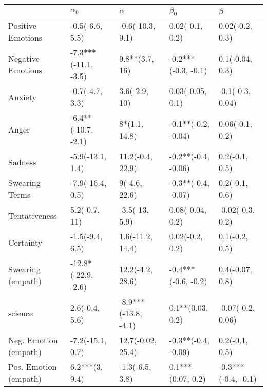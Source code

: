 \begin{tabular}{lllll}
\toprule
{} &            $\alpha_0$ &              $\alpha$ &            $\beta_0$ &              $\beta$ \\
\midrule
Positive Emotions     &       -0.5(-6.6, 5.5) &      -0.6(-10.3, 9.1) &      0.02(-0.1, 0.2) &      0.02(-0.2, 0.3) \\
Negative Emotions     &  -7.3***(-11.1, -3.5) &        9.8**(3.7, 16) &  -0.2***(-0.3, -0.1) &      0.1(-0.04, 0.3) \\
Anxiety               &       -0.7(-4.7, 3.3) &         3.6(-2.9, 10) &     0.03(-0.05, 0.1) &     -0.1(-0.3, 0.04) \\
Anger                 &   -6.4**(-10.7, -2.1) &         8*(1.1, 14.8) &  -0.1**(-0.2, -0.04) &      0.06(-0.1, 0.2) \\
Sadness               &      -5.9(-13.1, 1.4) &      11.2(-0.4, 22.9) &  -0.2**(-0.4, -0.06) &       0.2(-0.1, 0.5) \\
Swearing Terms        &      -7.9(-16.4, 0.5) &         9(-4.6, 22.6) &  -0.3**(-0.4, -0.07) &       0.2(-0.1, 0.6) \\
Tentativeness         &         5.2(-0.7, 11) &        -3.5(-13, 5.9) &     0.08(-0.04, 0.2) &     -0.02(-0.3, 0.2) \\
Certainty             &       -1.5(-9.4, 6.5) &      1.6(-11.2, 14.4) &      0.02(-0.2, 0.2) &       0.1(-0.2, 0.5) \\
Swearing (empath)     &   -12.8*(-22.9, -2.6) &      12.2(-4.2, 28.6) &  -0.4***(-0.6, -0.2) &      0.4(-0.07, 0.8) \\
science               &        2.6(-0.4, 5.6) &  -8.9***(-13.8, -4.1) &     0.1**(0.03, 0.2) &    -0.07(-0.2, 0.06) \\
Neg. Emotion (empath) &      -7.2(-15.1, 0.7) &     12.7(-0.02, 25.4) &  -0.3**(-0.4, -0.09) &       0.2(-0.1, 0.5) \\
Pos. Emotion (empath) &        6.2***(3, 9.4) &       -1.3(-6.5, 3.8) &    0.1***(0.07, 0.2) &  -0.3***(-0.4, -0.1) \\
\bottomrule
\end{tabular}
